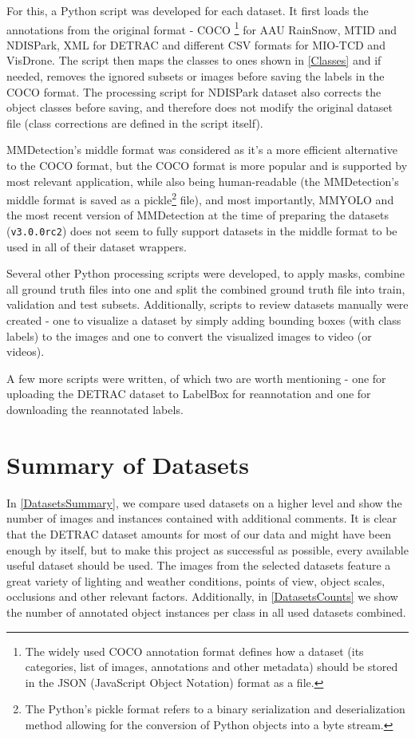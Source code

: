 For this, a Python script was developed for each dataset. It first loads the
annotations from the original format - COCO \footnote{The widely used COCO
annotation format defines how a dataset (its categories, list of images,
annotations and other metadata) should be stored in the JSON (JavaScript Object
Notation) format as a file.} for AAU RainSnow, MTID
and NDISPark, XML for DETRAC and different CSV formats for MIO-TCD and VisDrone.
The script then maps the classes to ones shown in \autoref{Classes} and if needed,
removes the ignored subsets or images before saving the labels in the COCO
format. The processing script for NDISPark dataset also corrects the object
classes before saving, and therefore does not modify the original dataset file
(class corrections are defined in the script itself).

MMDetection's middle format was considered as it's a more efficient alternative
to the COCO format, but the COCO format is more popular and is supported by most
relevant application, while also being human-readable (the MMDetection's middle
format is saved as a pickle\footnote{The Python's pickle format refers to a
binary serialization and deserialization method allowing for the conversion of
Python objects into a byte stream.} file), and most importantly, MMYOLO and the
most recent version of MMDetection at the time of preparing the datasets
(\texttt{v3.0.0rc2}) does not seem to fully support datasets in the middle
format to be used in all of their dataset wrappers.

Several other Python processing scripts were developed, to apply masks, combine
all ground truth files into one and split the combined ground truth file into
train, validation and test subsets. Additionally, scripts to review datasets
manually were created - one to visualize a dataset by simply adding bounding
boxes (with class labels) to the images and one to convert the visualized images
to video (or videos).

A few more scripts were written, of which two are worth mentioning - one for
uploading the DETRAC dataset to LabelBox for reannotation and one for
downloading the reannotated labels.


\section{Summary of Datasets}

In \autoref{DatasetsSummary}, we compare used datasets on a higher level and
show the number of images and instances contained with additional comments. It
is clear that the DETRAC dataset amounts for most of our
data and might have been enough by itself, but to make this project as
successful as possible, every available useful dataset should be used. The
images from the selected datasets feature a great variety of lighting and
weather conditions, points of view, object scales, occlusions and other relevant factors.
Additionally, in \autoref{DatasetsCounts} we show the number of annotated object
instances per class in all used datasets combined.

